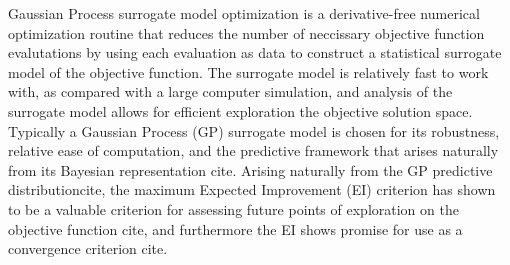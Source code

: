 \documentclass[12pt]{article}
\begin{document}
Gaussian Process surrogate model optimization is a derivative-free numerical optimization routine that reduces the number of neccissary objective function evalutations by using each evaluation as data to construct a statistical surrogate model of the objective function.
%
The surrogate model is relatively fast to work with, as compared with a large computer simulation, and analysis of the surrogate model allows for efficient exploration the objective solution space.  
%
Typically a Gaussian Process (GP) surrogate model is chosen for its robustness, relative ease of computation, and the predictive framework that arises naturally from its Bayesian representation \cite{santnerBook}{\color{red}cite}.
Arising naturally from the GP predictive distribution{\color{red}cite}, the maximum Expected Improvement (EI) criterion has shown to be a valuable criterion for assessing future points of exploration on the objective function {\color{red}cite}, and furthermore the EI shows promise for use as a convergence criterion {\color{red}cite}.
%


%
%
\end{document}
